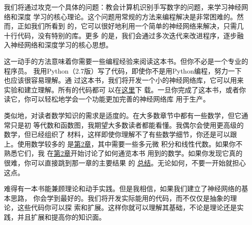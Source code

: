 我们将通过攻克一个具体的问题：教会计算机识别手写数字的问题，来学习神经网络和深度
学习的核心理论。这个问题用常规的方法来编程解决是非常困难的。然而，正如我们所看到
的，它可以很好地利用一个简单的神经网络来解决，只需几十行代码，没有特别的库。更多
的是，我们会通过多次迭代来改进程序，逐步融入神经网络和深度学习的核心思想。

这一动手的方法意味着你需要一些编程经验来阅读这本书。但你不必是一个专业的程序员。
我用Python（2.7版）写了代码，即使你不是用Python编程，努力一下也应该很容易理解。通
过这本书，我们将开发一个小的神经网络库，它可以用来实验和建立理解。所有的代码都可
以在\href{https://github.com/mnielsen/neural-networks-and-deep-learning}{这里}下
载。一旦你完成了这本书，或者你读它，你可以轻松地学会一个功能更加完善的神经网络库
用于生产。

类似地，对读者数学知识的需求是适度的。在大多数章节中都有一些数学，但它通常只是初
等代数和函数图，我期望大多数读者都能看懂。我偶尔会使用更高级的数学，但已经组织了
材料，这样即使你理解不了有些数学细节，你还是可以跟上。使用数学较多的
是\hyperref[ch:HowTheBackpropagationAlgorithmWorks]{第2章}，其中需要一些多元微
积分和线性代数。如果你不熟悉它们，我
在\hyperref[ch:HowTheBackpropagationAlgorithmWorks]{第2章}开始讨论了如何通览本书
用到的数学。如果你发现它真的很难，你可以直接跳到那一章的主要结果
的%
\href{http://neuralnetworksanddeeplearning.com/chap2.html#the_backpropagation_algorithm}{
  总结}。无论如何，不要一开始就担心这点。

难得有一本书能兼顾理论和动手实践。但是我相信，如果我们建立了神经网络的基本思路，
你会学到最好的。我们将开发实际能用的代码，而不仅仅是抽象的理论，这些代码你可以探
索和扩展。这样你就可以理解其基础，不论是理论还是实践，并且扩展和提高你的知识面。
